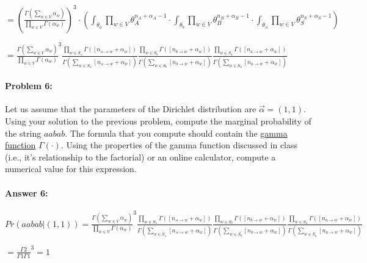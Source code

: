 \documentclass[10pt]{article}
\begin{document}
$=\left(\frac{\Gamma(\sum_{w \in V} \alpha_{w})}{\prod_{w \in V} \Gamma(\alpha_{w})}\right)^3\cdot{\left(\int_{\theta_{a}}\prod_{w \in V} \theta_{A}^{n_A+\alpha_{A}-1}\cdot{\int_{\theta_{b}}\prod_{w \in V} \theta_{B}^{n_B+\alpha_{B}-1}\cdot{\int_{\theta_{\rtimes}}\prod_{w \in V} \theta_{S}^{n_S+\alpha_{S}-1}}}\right)}$

$= {\frac {\Gamma\left(\sum_{w \in V}\alpha _{w}\right)}{\prod _{w \in V} \Gamma (\alpha _{w})}}^3{\frac{\prod _{w \in S_\rtimes} \Gamma([n_{\rtimes \rightarrow w}+\alpha_{w}])}{\Gamma \left(\sum_{w\in S_\rtimes}[n_{\rtimes \rightarrow w}+\alpha_{w}]\right)}}{\frac{\prod _{w \in S_b} \Gamma([n_{b \rightarrow w}+\alpha_{w}])}{\Gamma \left(\sum_{w\in S_b}[n_{b \rightarrow w}+\alpha_{w}]\right)}}{\frac{\prod _{w \in S_a} \Gamma([n_{a \rightarrow w}+\alpha_{w}])}{\Gamma \left(\sum_{w\in S_a}[n_{a \rightarrow w}+\alpha_{w}]\right)}}$


\noindent\hrulefill %

\paragraph{Problem 6:}

Let us assume that the parameters of the Dirichlet distribution are
$\vec{\alpha} = (1,1)$. Using your solution to the previous problem,
compute the marginal probability of the string $aabab$. The formula
that you compute should contain the
\href{https://en.wikipedia.org/wiki/Gamma_function}{gamma function}
$\Gamma(\cdot)$. Using the properties of the gamma function discussed
in class (i.e., it's relationship to the factorial) or an online
calculator, compute a numerical value for this expression.


\paragraph{Answer 6:} $Pr(aabab|(1,1)) = {\frac {\Gamma\left(\sum_{w \in V}\alpha _{w}\right)}{\prod _{w \in V} \Gamma (\alpha _{w})}}^3{\frac{\prod _{w \in S_\rtimes} \Gamma([n_{\rtimes \rightarrow w}+\alpha_{w}])}{\Gamma \left(\sum_{w\in S_\rtimes}[n_{\rtimes \rightarrow w}+\alpha_{w}]\right)}}{\frac{\prod _{w \in S_b} \Gamma([n_{b \rightarrow w}+\alpha_{w}])}{\Gamma \left(\sum_{w\in S_b}[n_{b \rightarrow w}+\alpha_{w}]\right)}}{\frac{\prod _{w \in S_a} \Gamma([n_{a \rightarrow w}+\alpha_{w}])}{\Gamma \left(\sum_{w\in S_a}[n_{a \rightarrow w}+\alpha_{w}]\right)}}$

$ ={\frac {\Gamma{2}}{\Gamma{1}\Gamma{1}}}^3 = 1$
\end{document}
